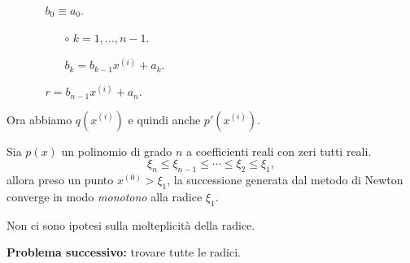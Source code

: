 {\samepage\begin{itemize}
\item[]
\begin{itemize}
\item[] $b_0 \equiv a_0$.
\item[]\begin{itemize}
  \item[$\circ$]$k = 1, \ldots, n-1.$
  \item[]$b_k = b_{k-1}x^{(i)} + a_k$.
  \end{itemize}
\item[]$r = b_{n-1}x^{(i)} + a_n.$
\end{itemize}       
\end{itemize}
}
Ora abbiamo $q\left(x^{(i)}\right)$ e quindi anche $p'\left(x^{(i)}\right)$.

\begin{teo}\label{teo10.16}
Sia $p(x)$ un polinomio di grado $n$ a coefficienti reali con zeri tutti
reali.
\[
\xi_{n} \leq \xi_{n-1} \leq \cdots \leq \xi_{2} \leq \xi_1,
\]
allora preso un punto $x^{(0)} > \xi_1$, la successione generata dal metodo di 
Newton converge in modo \emph{monotono} alla radice $\xi_1$.
\end{teo}
\begin{osse}
Non ci sono ipotesi sulla molteplicità della radice.
\end{osse}
\textbf{Problema successivo:} trovare tutte le radici.


